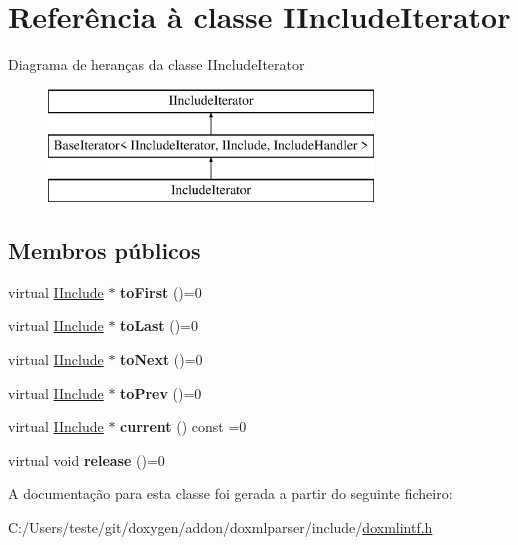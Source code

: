\hypertarget{class_i_include_iterator}{\section{Referência à classe I\-Include\-Iterator}
\label{class_i_include_iterator}
}
Diagrama de heranças da classe I\-Include\-Iterator\begin{figure}[H]
\begin{center}
\leavevmode
\includegraphics[height=3.000000cm]{class_i_include_iterator}
\end{center}
\end{figure}
\subsection*{Membros públicos}
\begin{DoxyCompactItemize}
\item 
\hypertarget{class_i_include_iterator_a361e78d5bba1f48d20f3cd5fba16d1a9}{virtual \hyperlink{class_i_include}{I\-Include} $\ast$ {\bfseries to\-First} ()=0}\label{class_i_include_iterator_a361e78d5bba1f48d20f3cd5fba16d1a9}

\item 
\hypertarget{class_i_include_iterator_a1a9dddb5cecc7455c4508c367afbc4e3}{virtual \hyperlink{class_i_include}{I\-Include} $\ast$ {\bfseries to\-Last} ()=0}\label{class_i_include_iterator_a1a9dddb5cecc7455c4508c367afbc4e3}

\item 
\hypertarget{class_i_include_iterator_ae33f75f1a3a4fd4c28286e02cb160bc2}{virtual \hyperlink{class_i_include}{I\-Include} $\ast$ {\bfseries to\-Next} ()=0}\label{class_i_include_iterator_ae33f75f1a3a4fd4c28286e02cb160bc2}

\item 
\hypertarget{class_i_include_iterator_a16dfee187dea25f27447785e6cb78426}{virtual \hyperlink{class_i_include}{I\-Include} $\ast$ {\bfseries to\-Prev} ()=0}\label{class_i_include_iterator_a16dfee187dea25f27447785e6cb78426}

\item 
\hypertarget{class_i_include_iterator_abf0ffbe4c563891e2523de72630c2332}{virtual \hyperlink{class_i_include}{I\-Include} $\ast$ {\bfseries current} () const =0}\label{class_i_include_iterator_abf0ffbe4c563891e2523de72630c2332}

\item 
\hypertarget{class_i_include_iterator_aab0a52fdd148a54108e7bf49287d7c47}{virtual void {\bfseries release} ()=0}\label{class_i_include_iterator_aab0a52fdd148a54108e7bf49287d7c47}

\end{DoxyCompactItemize}


A documentação para esta classe foi gerada a partir do seguinte ficheiro\-:\begin{DoxyCompactItemize}
\item 
C\-:/\-Users/teste/git/doxygen/addon/doxmlparser/include/\hyperlink{include_2doxmlintf_8h}{doxmlintf.\-h}\end{DoxyCompactItemize}
